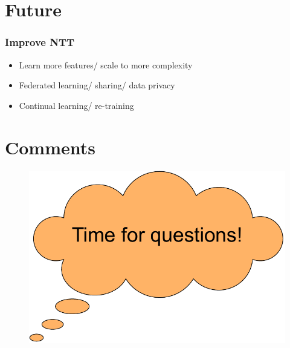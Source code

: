 \documentclass{beamer}
\begin{document}

\section{Future}

\begin{frame}
\frametitle{Improve NTT}

\begin{itemize}
    \item<1-> Learn more features/ scale to more complexity
    \item<2-> Federated learning/ sharing/ data privacy
    \item<3-> Continual learning/ re-training
\end{itemize}
\end{frame}

\section{Comments}
\begin{frame}

\begin{figure}[h]
  \begin{center}
    \includegraphics[scale=0.55]{figures/questions.pdf}
    \label{fig:questions}
  \end{center}
\end{figure}


\end{frame}
\end{document}

